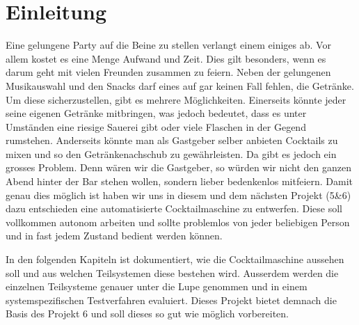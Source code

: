 \clearpage
\section{Einleitung}
\label{sec:Einleitung}

Eine gelungene Party auf die Beine zu stellen verlangt einem einiges ab. Vor allem kostet es eine Menge Aufwand und Zeit. Dies gilt besonders, wenn es darum geht mit vielen Freunden zusammen zu feiern. Neben der gelungenen Musikauswahl und den Snacks darf eines auf gar keinen Fall fehlen, die Getränke. Um diese sicherzustellen, gibt es mehrere Möglichkeiten. Einerseits könnte jeder seine eigenen Getränke mitbringen, was jedoch bedeutet, dass es unter Umständen eine riesige Sauerei gibt oder viele Flaschen in der Gegend rumstehen. Anderseits könnte man als Gastgeber selber anbieten Cocktails zu mixen und so den Getränkenachschub zu gewährleisten. Da gibt es jedoch ein grosses Problem. Denn wären wir die Gastgeber, so würden wir nicht den ganzen Abend hinter der Bar stehen wollen, sondern lieber bedenkenlos mitfeiern. Damit genau dies möglich ist haben wir uns in diesem und dem nächsten Projekt (5\&6) dazu entschieden eine automatisierte Cocktailmaschine zu entwerfen. Diese soll vollkommen autonom arbeiten und sollte problemlos von jeder beliebigen Person und in fast jedem Zustand bedient werden können. 

In den folgenden Kapiteln ist dokumentiert, wie die Cocktailmaschine aussehen soll und aus welchen Teilsystemen diese bestehen wird. Ausserdem werden die einzelnen Teilsysteme genauer unter die Lupe genommen und in einem systemspezifischen Testverfahren evaluiert. Dieses Projekt bietet demnach die Basis des Projekt 6 und soll dieses so gut wie möglich vorbereiten.